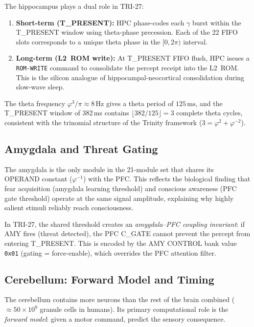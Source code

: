 The hippocampus plays a dual role in TRI-27:
\begin{enumerate}
  \item \textbf{Short-term (T\_PRESENT):}
    HPC phase-codes each $\gamma$ burst within the T\_PRESENT
    window using theta-phase precession.
    Each of the 22 FIFO slots corresponds to a unique theta phase
    in the $[0, 2\pi)$ interval.
  \item \textbf{Long-term (L2~ROM write):}
    At T\_PRESENT FIFO flush, HPC issues a
    \texttt{ROM-WRITE} command to consolidate the percept receipt
    into the L2~ROM.
    This is the silicon analogue of hippocampal-neocortical
    consolidation during slow-wave sleep.
\end{enumerate}

The theta frequency $\varphi^3/\pi \approx 8\,\mathrm{Hz}$
gives a theta period of $125\,\mathrm{ms}$,
and the T\_PRESENT window of 382\,ms contains
$\lfloor 382/125 \rfloor = 3$ complete theta cycles,
consistent with the trinomial
structure of the Trinity framework ($3 = \varphi^2 + \varphi^{-2}$).

\subsection{Amygdala and Threat Gating}
\label{sec:73:ext-amygdala}

The amygdala is the only module in the 21-module set that shares
its OPERAND constant ($\varphi^{-1}$) with the PFC.
This reflects the biological finding that fear acquisition
(amygdala learning threshold) and conscious awareness (PFC
gate threshold) operate at the same signal amplitude, explaining
why highly salient stimuli reliably reach consciousness.

In TRI-27, the shared threshold creates an
\emph{amygdala--PFC coupling invariant}:
if AMY fires (threat detected), the PFC C\_GATE cannot prevent
the percept from entering T\_PRESENT.
This is encoded by the AMY CONTROL bank value \texttt{0x01}
(gating = force-enable), which overrides the PFC attention
filter.

\subsection{Cerebellum: Forward Model and Timing}
\label{sec:73:ext-cbll}

The cerebellum contains more neurons than the rest of the brain
combined ($\approx 50\times10^{9}$ granule cells in humans).
Its primary computational role is the \emph{forward model}:
given a motor command, predict the sensory consequence.

